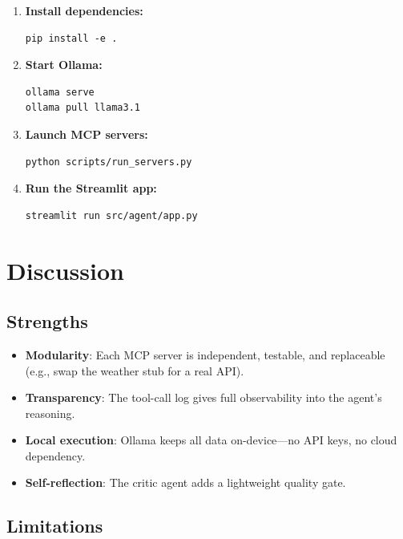 \documentclass[12pt,a4paper]{article}
\begin{document}
\begin{enumerate}
  \item \textbf{Install dependencies:}
        \begin{verbatim}
pip install -e .
        \end{verbatim}
  \item \textbf{Start Ollama:}
        \begin{verbatim}
ollama serve
ollama pull llama3.1
        \end{verbatim}
  \item \textbf{Launch MCP servers:}
        \begin{verbatim}
python scripts/run_servers.py
        \end{verbatim}
  \item \textbf{Run the Streamlit app:}
        \begin{verbatim}
streamlit run src/agent/app.py
        \end{verbatim}
\end{enumerate}

\section{Discussion}

\subsection{Strengths}

\begin{itemize}[nosep]
  \item \textbf{Modularity}: Each MCP server is independent, testable, and
        replaceable (e.g., swap the weather stub for a real API).
  \item \textbf{Transparency}: The tool-call log gives full observability
        into the agent's reasoning.
  \item \textbf{Local execution}: Ollama keeps all data on-device—no API
        keys, no cloud dependency.
  \item \textbf{Self-reflection}: The critic agent adds a lightweight
        quality gate.
\end{itemize}

\subsection{Limitations}
\end{document}
